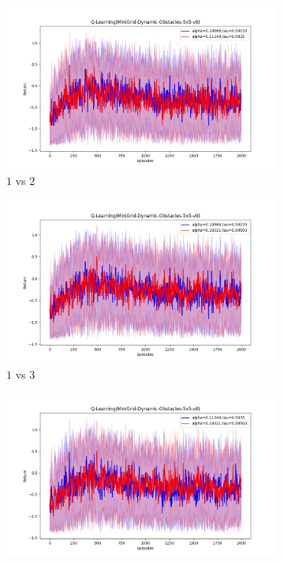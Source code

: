 \documentclass[11pt, a4]{article}
\begin{document}
				\begin{figure}[H]
					\centering
					\begin{subfigure}{.7\textwidth}
						\centering
						\includegraphics[width=\textwidth]{../minigrid_world/plots/qlearning_Figure_1.png}
						\caption{$1$ vs $2$}
						\label{fig:qlearningminigridworld1vs2}
					\end{subfigure}
					\hfill
					\begin{subfigure}{.7\textwidth}
						\centering
						\includegraphics[width=\textwidth]{../minigrid_world/plots/qlearning_Figure_2.png}
						\caption{$1$ vs $3$}
						\label{fig:qlearningminigridworld1vs3}
					\end{subfigure}
					\hfill
					\begin{subfigure}{.7\textwidth}
						\centering
						\includegraphics[width=\textwidth]{../minigrid_world/plots/qlearning_Figure_3.png}

\end{subfigure}
\end{figure}
\end{document}
